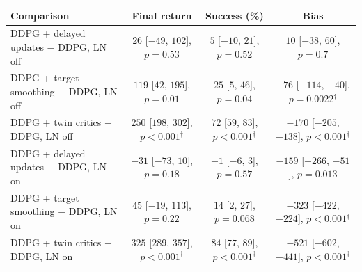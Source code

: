 \begin{tabular}{@{}lccc@{}}
\toprule
Comparison & Final return & Success (\%) & Bias \\
\midrule
DDPG + delayed updates $-$ DDPG, LN off & $26$ {\scriptsize[$-49$, $102$]}, $p=0.53$ & $5$ {\scriptsize[$-10$, $21$]}, $p=0.52$ & $10$ {\scriptsize[$-38$, $60$]}, $p=0.7$ \\
DDPG + target smoothing $-$ DDPG, LN off & $119$ {\scriptsize[$42$, $195$]}, $p=0.01$ & $25$ {\scriptsize[$5$, $46$]}, $p=0.04$ & $-76$ {\scriptsize[$-114$, $-40$]}, $p=0.0022$$^\dagger$ \\
DDPG + twin critics $-$ DDPG, LN off & $250$ {\scriptsize[$198$, $302$]}, $p<0.001$$^\dagger$ & $72$ {\scriptsize[$59$, $83$]}, $p<0.001$$^\dagger$ & $-170$ {\scriptsize[$-205$, $-138$]}, $p<0.001$$^\dagger$ \\
DDPG + delayed updates $-$ DDPG, LN on & $-31$ {\scriptsize[$-73$, $10$]}, $p=0.18$ & $-1$ {\scriptsize[$-6$, $3$]}, $p=0.57$ & $-159$ {\scriptsize[$-266$, $-51$]}, $p=0.013$ \\
DDPG + target smoothing $-$ DDPG, LN on & $45$ {\scriptsize[$-19$, $113$]}, $p=0.22$ & $14$ {\scriptsize[$2$, $27$]}, $p=0.068$ & $-323$ {\scriptsize[$-422$, $-224$]}, $p<0.001$$^\dagger$ \\
DDPG + twin critics $-$ DDPG, LN on & $325$ {\scriptsize[$289$, $357$]}, $p<0.001$$^\dagger$ & $84$ {\scriptsize[$77$, $89$]}, $p<0.001$$^\dagger$ & $-521$ {\scriptsize[$-602$, $-441$]}, $p<0.001$$^\dagger$ \\
\bottomrule
\end{tabular}
